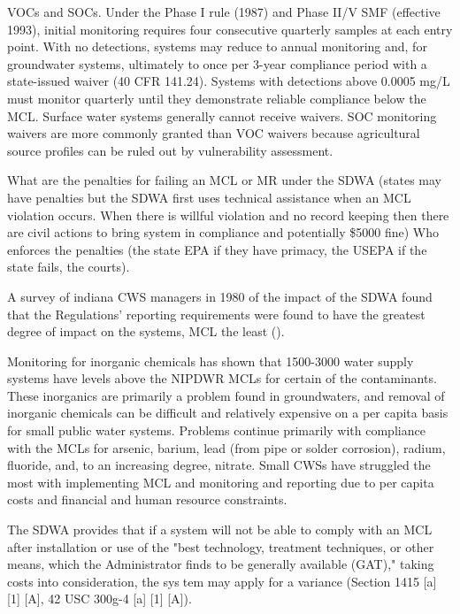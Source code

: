 VOCs and SOCs. Under the Phase I rule (1987) and Phase II/V SMF (effective 1993), initial monitoring requires four consecutive quarterly samples at each entry point. With no detections, systems may reduce to annual monitoring and, for groundwater systems, ultimately to once per 3-year compliance period with a state-issued waiver (40 CFR 141.24). Systems with detections above 0.0005 mg/L must monitor quarterly until they demonstrate reliable compliance below the MCL. Surface water systems generally cannot receive waivers. SOC monitoring waivers are more commonly granted than VOC waivers because agricultural source profiles can be ruled out by vulnerability assessment.

What are the penalties for failing an MCL or MR under the SDWA (states may have penalties but the SDWA first uses technical assistance when an MCL violation occurs. When there is willful violation and no record keeping then there are civil actions to bring system in compliance and potentially \$5000 fine) Who enforces the penalties (the state EPA if they have primacy, the USEPA if the state fails, the courts).

A survey of indiana CWS managers in 1980 of the impact of the SDWA found that the Regulations' reporting requirements were found to have the greatest degree of impact on the systems, MCL the least (\cite{oleckno1982national}).

Monitoring for inorganic chemicals
has shown that 1500-3000 water supply
systems have levels above the NIPDWR
MCLs for certain of the contaminants.
These inorganics are primarily a problem
found in groundwaters, and removal of
inorganic chemicals can be difficult and
relatively expensive on a per capita
basis for small public water systems.
Problems continue primarily with compliance with the MCLs for arsenic,
barium, lead (from pipe or solder corrosion), radium, fluoride, and, to an increasing degree, nitrate. Small CWSs have struggled the most with implementing MCL and monitoring and reporting due to per capita costs and financial and human resource constraints.

The SDWA provides that if a system
will not be able to comply with an MCL after installation or use of the "best
technology, treatment techniques, or
other means, which the Administrator
finds to be generally available (GAT),"
taking costs into consideration, the system may apply for a variance (Section
1415 [a] [1] [A], 42 USC 300g-4 [a] [1] [A]).

